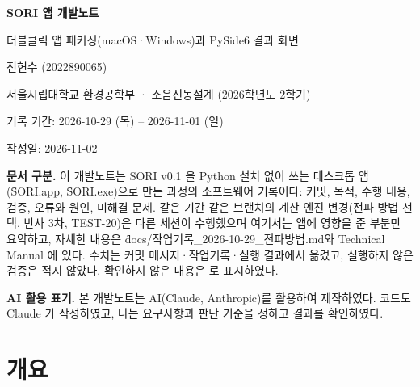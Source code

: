 \documentclass[10.5pt,a4paper]{article}
\begin{document}
\sloppy

\begin{titlepage}
\centering\vspace*{45mm}
{\sffamily\Huge\bfseries\color{navy} SORI 앱 개발노트\par}
\vspace{6mm}
{\sffamily\large 더블클릭 앱 패키징(macOS·Windows)과 PySide6 결과 화면\par}
\vspace{20mm}
{\large 전현수 (2022890065)\par}
\vspace{2mm}
{서울시립대학교 환경공학부 · 소음진동설계 (2026학년도 2학기)\par}
\vspace{10mm}
{기록 기간: 2026-10-29 (목) – 2026-11-01 (일)\par}
{작성일: 2026-11-02\par}
\vfill
\begin{minipage}{0.85\textwidth}\small
\textbf{문서 구분.} 이 개발노트는 SORI v0.1 을 Python 설치 없이 쓰는 데스크톱 앱(\f{SORI.app}, \f{SORI.exe})으로 만든 과정의 소프트웨어 기록이다: 커밋, 목적, 수행 내용, 검증, 오류와 원인, 미해결 문제. 같은 기간 같은 브랜치의 계산 엔진 변경(전파 방법 선택, 반사 3차, TEST-20)은 다른 세션이 수행했으며 여기서는 앱에 영향을 준 부분만 요약하고, 자세한 내용은 \f{docs/작업기록\_2026-10-29\_전파방법.md}와 Technical Manual 에 있다. 수치는 커밋 메시지·작업기록·실행 결과에서 옮겼고, 실행하지 않은 검증은 적지 않았다. 확인하지 않은 내용은 \chk{}로 표시하였다.\par\vspace{2mm}
\textbf{AI 활용 표기.} 본 개발노트는 AI(Claude, Anthropic)를 활용하여 제작하였다. 코드도 Claude 가 작성하였고, 나는 요구사항과 판단 기준을 정하고 결과를 확인하였다.
\end{minipage}
\end{titlepage}

\tableofcontents
\clearpage

\section{개요}
\end{document}
